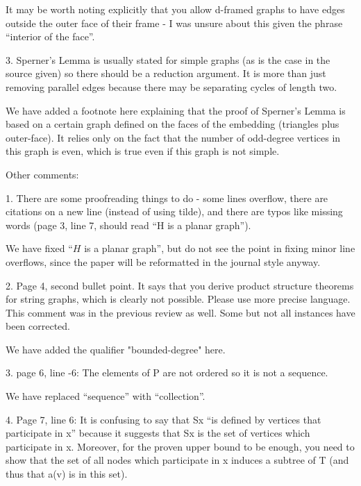 \documentclass[12pt]{article}
\newenvironment{response}{\color{blue}}{}
\begin{document}
It may be worth noting explicitly that you allow d-framed graphs to
have edges outside the outer face of their frame - I was unsure about
this given the phrase “interior of the face”.


3. Sperner’s Lemma is usually stated for simple graphs (as is the case
in the source given) so there should be a reduction argument. It is
more than just removing parallel edges because there may be separating
cycles of length two.

\begin{response}
  We have added a footnote here explaining that the proof of Sperner's Lemma is based on a certain graph defined on the faces of the embedding (triangles plus outer-face).  It relies only on the fact that the number of odd-degree vertices in this graph is even, which is true even if this graph is not simple.
\end{response}

Other comments:

1. There are some proofreading things to do - some lines overflow, there
are citations on a new line (instead of using tilde), and there are typos
like missing words (page 3, line 7, should read “H is a planar graph”).

\begin{response}
	We have fixed ``$H$ is a planar graph'', but do not see the point in fixing minor line overflows, since the paper will be reformatted in the journal style anyway.
\end{response}


2. Page 4, second bullet point. It says that you derive product structure
theorems for string graphs, which is clearly not possible. Please use
more precise language. This comment was in the previous review as
well. Some but not all instances have been corrected.

\begin{response}
  We have added the qualifier "bounded-degree" here.
\end{response}

3. page 6, line -6: The elements of P are not ordered so it is not a sequence.

\begin{response}
  We have replaced ``sequence'' with ``collection''.
\end{response}

4. Page 7, line 6: It is confusing to say that Sx “is defined by vertices
that participate in x” because it suggests that Sx is the set of vertices
which participate in x. Moreover, for the proven upper bound to be
enough, you need to show that the set of all nodes which participate in
x induces a subtree of T (and thus that a(v) is in this set).
\end{document}
